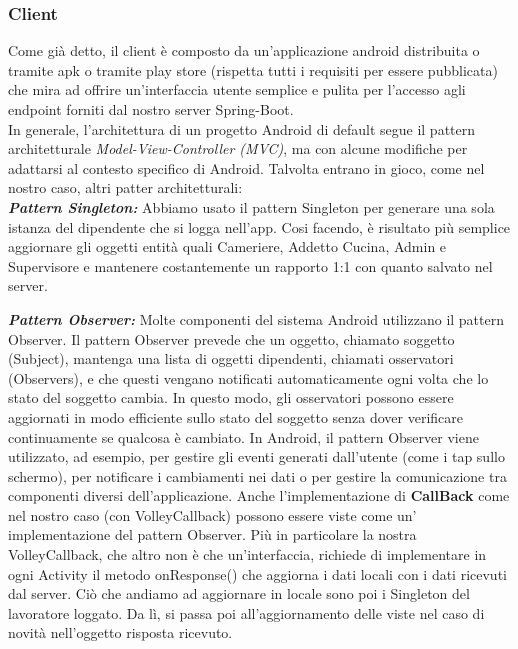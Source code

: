     \subsubsection{Client}
    \begin{flushleft}
        Come già detto, il client è composto da un'applicazione android distribuita o tramite apk o tramite play store (rispetta tutti i requisiti per essere pubblicata) che mira ad offrire un'interfaccia utente semplice e pulita 
        per l'accesso agli endpoint forniti dal nostro server Spring-Boot. \\
        In generale, l'architettura di un progetto Android di default segue il pattern architetturale \emph{Model-View-Controller (MVC)}, 
        ma con alcune modifiche per adattarsi al contesto specifico di Android. Talvolta entrano in gioco, come nel nostro caso, altri patter architetturali:\\
        \vspace{1cm}
        \textbf{\emph{Pattern Singleton:}} Abbiamo usato il pattern Singleton per generare una sola istanza del dipendente che si logga nell'app. 
        Cosi facendo, è risultato più semplice aggiornare gli oggetti entità quali Cameriere, Addetto Cucina, Admin e Supervisore e mantenere costantemente un rapporto 1:1 con quanto salvato nel server.\vspace{1cm}
        
        \textbf{\emph{Pattern Observer:}} Molte componenti del sistema Android utilizzano il pattern Observer. 
        Il pattern Observer prevede che un oggetto, chiamato soggetto (Subject), mantenga una lista di oggetti dipendenti, chiamati osservatori (Observers), 
        e che questi vengano notificati automaticamente ogni volta che lo stato del soggetto cambia. In questo modo, 
        gli osservatori possono essere aggiornati in modo efficiente sullo stato del soggetto senza dover verificare continuamente se qualcosa è cambiato.
        In Android, il pattern Observer viene utilizzato, ad esempio, per gestire gli eventi generati dall'utente (come i tap sullo schermo), per notificare i cambiamenti nei dati  o per gestire la comunicazione tra componenti diversi dell'applicazione.
        Anche l'implementazione di \textbf{CallBack} come nel nostro caso (con VolleyCallback) possono essere viste come un' implementazione del pattern Observer.
        Più in particolare la nostra VolleyCallback, che altro non è che un'interfaccia, richiede di implementare in ogni Activity il metodo onResponse() che aggiorna i dati locali con i dati ricevuti dal server.
        Ciò che andiamo ad aggiornare in locale sono poi i Singleton del lavoratore loggato. Da lì, si passa poi all'aggiornamento delle viste nel caso di novità nell'oggetto risposta ricevuto. \vspace{1cm}
       

\end{flushleft}
